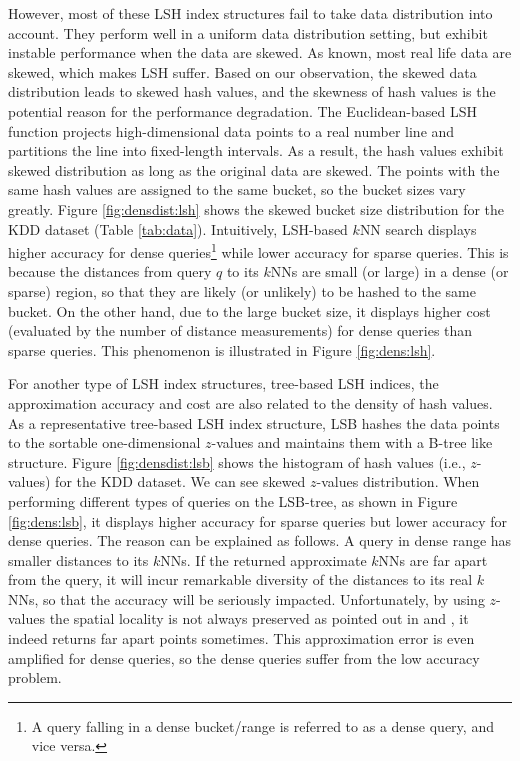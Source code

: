 However, most of these LSH index structures fail to take data distribution into account. They perform well in a uniform data distribution setting, but exhibit instable performance when the data are skewed. As known, most real life data are skewed, which makes LSH suffer. Based on our observation, the skewed data distribution leads to skewed hash values, and the skewness of hash values is the potential reason for the performance degradation. The Euclidean-based LSH function \cite{datar} projects high-dimensional data points to a real number line and partitions the line into fixed-length intervals. As a result, the hash values exhibit skewed distribution as long as the original data are skewed. The points with the same hash values are assigned to the same bucket, so the bucket sizes vary greatly. Figure \ref{fig:densdist:lsh} shows the skewed bucket size distribution for the KDD dataset (Table \ref{tab:data}). Intuitively, LSH-based $k$NN search displays higher accuracy for dense queries\footnote{A query falling in a dense bucket/range is referred to as a dense query, and vice versa.} while lower accuracy for sparse queries. This is because the distances from query $q$ to its $k$NNs are small (or large) in a dense (or sparse) region, so that they are likely (or unlikely) to be hashed to the same bucket. On the other hand, due to the large bucket size, it displays higher cost (evaluated by the number of distance measurements) for dense queries than sparse queries. This phenomenon is illustrated in Figure \ref{fig:dens:lsh}. %

For another type of LSH index structures, tree-based LSH indices, the approximation accuracy and cost are also related to the density of hash values. As a representative tree-based LSH index structure, LSB \cite{lsb} hashes the data points to the sortable one-dimensional $z$-values and maintains them with a B-tree like structure. Figure \ref{fig:densdist:lsb} shows the histogram of hash values (i.e., $z$-values) for the KDD dataset. We can see skewed $z$-values distribution. When performing different types of queries on the LSB-tree, as shown in Figure \ref{fig:dens:lsb}, it displays higher accuracy for sparse queries but lower accuracy for dense queries. The reason can be explained as follows. A query in dense range has smaller distances to its $k$NNs. If the returned approximate $k$NNs are far apart from the query, it will incur remarkable diversity of the distances to its real $k$NNs, so that the accuracy will be seriously impacted. Unfortunately, by using $z$-values the spatial locality is not always preserved as pointed out in \cite{zorkderknn} and \cite{Zhang:2012:EPK:2247596.2247602}, it indeed returns far apart points sometimes. This approximation error is even amplified for dense queries, so the dense queries suffer from the low accuracy problem.


